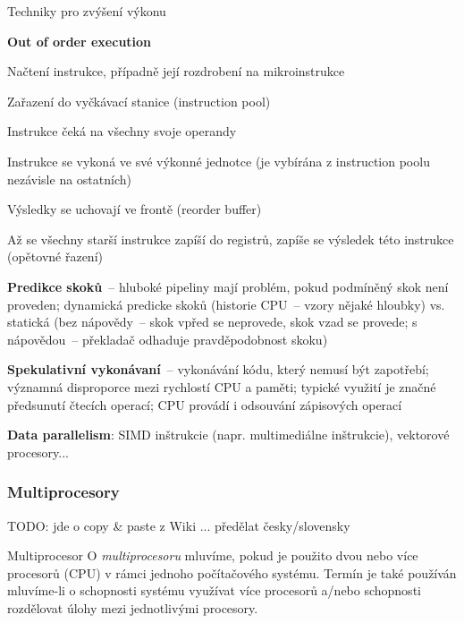 \begin{obecne}{Techniky pro zvýšení výkonu}
\begin{pitemize}
  \item \textbf{Out of order execution}
  \begin{penumerate}
	  \item Načtení instrukce, případně její rozdrobení na mikroinstrukce
	  \item Zařazení do vyčkávací stanice (instruction pool)
	  \item Instrukce čeká na všechny svoje operandy
	  \item Instrukce se vykoná ve své výkonné jednotce (je vybírána z instruction poolu nezávisle na ostatních)
	  \item Výsledky se uchovají ve frontě (reorder buffer)
	  \item Až se všechny starší instrukce zapíší do registrů, zapíše se výsledek této instrukce (opětovné řazení)
  \end{penumerate}

  \item \textbf{Predikce skoků}~-- hluboké pipeliny mají problém, pokud podmíněný skok není proveden; dynamická predicke skoků (historie CPU~-- vzory nějaké hloubky) vs. statická (bez nápovědy~-- skok vpřed se neprovede, skok vzad se provede; s nápovědou~-- překladač odhaduje pravděpodobnost skoku)

  \item \textbf{Spekulativní vykonávaní}~-- vykonávání kódu, který nemusí být zapotřebí; významná disproporce mezi rychlostí CPU a paměti; typické využití je značné předsunutí čtecích operací; CPU provádí i odsouvání zápisových operací


  \item \textbf{Data parallelism}: SIMD inštrukcie (napr. multimediálne inštrukcie), vektorové procesory...
\end{pitemize}
\end{obecne}

\subsubsection*{Multiprocesory}

TODO: jde o copy \& paste z Wiki ... předělat česky/slovensky
\medskip

\begin{definiceN}{Multiprocesor}
  O \emph{multiprocesoru} mluvíme, pokud je použito dvou nebo více procesorů
  (CPU) v rámci jednoho počítačového systému. Termín je také používán mluvíme-li
  o schopnosti systému využívat více procesorů a/nebo schopnosti rozdělovat
  úlohy mezi jednotlivými procesory.
\end{definiceN}


